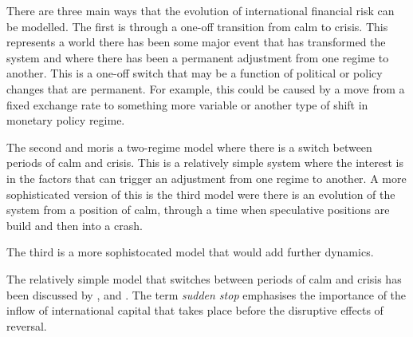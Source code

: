 \documentclass[12pt, a4paper, oneside]{article} %
\begin{document}



There are three main ways that the evolution of international financial risk can be modelled.  The first is through a one-off transition from calm to crisis. This represents a world there has been some major event that has transformed the system and where there has been a permanent adjustment from one regime to another.  This is a one-off switch that may be a function of political or policy changes that are permanent. For example, this could be caused by a move from a fixed exchange rate to something more variable or another type of shift in monetary policy regime.   

The second and moris a two-regime model where there is a switch between periods of calm and crisis.  This is  a relatively simple system where the interest is in the factors that can trigger an adjustment from one regime to another.  A more sophisticated version of this is the third model were there is an evolution of the system from a position of calm, through a time when speculative positions are build and then into a crash. 

The third is a more sophistocated model that would add further dynamics. 

The relatively simple model that switches between periods of calm and crisis has been discussed by \citet{DornbuschSS}, \citet{CalvoSS} and \citet{KrugmanSS}.  The term \emph{sudden stop} emphasises the importance of the inflow of international capital that takes place before the disruptive effects of reversal.  

\end{document}
